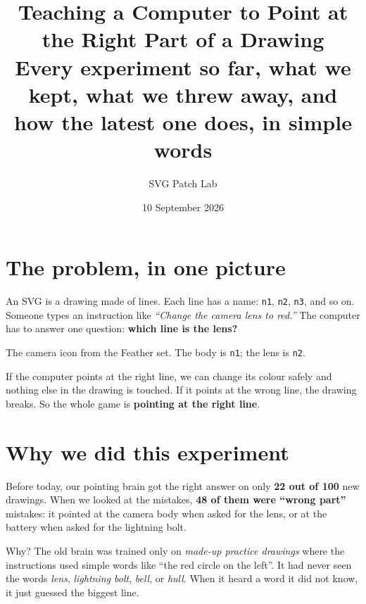 \documentclass[11pt,a4paper]{article}
\title{\Huge Teaching a Computer to Point at the Right Part of a Drawing\\[6pt]
\Large Every experiment so far, what we kept, what we threw away, and how the latest one does, in simple words}
\author{SVG Patch Lab}
\date{10 September 2026}
\begin{document}
\maketitle

\section*{The problem, in one picture}

An SVG is a drawing made of lines. Each line has a name: \texttt{n1}, \texttt{n2}, \texttt{n3}, and so on.
Someone types an instruction like \emph{``Change the camera lens to red.''}
The computer has to answer one question: \textbf{which line is the lens?}

\begin{center}

\small The camera icon from the Feather set. The body is \texttt{n1}; the lens is \texttt{n2}.
\end{center}

If the computer points at the right line, we can change its colour safely and nothing else in the drawing is touched.
If it points at the wrong line, the drawing breaks.
So the whole game is \textbf{pointing at the right line}.

\section*{Why we did this experiment}

Before today, our pointing brain got the right answer on only \textbf{22 out of 100} new drawings.
When we looked at the mistakes, \textbf{48 of them were ``wrong part''} mistakes: it pointed at the camera body when asked for the lens, or at the battery when asked for the lightning bolt.

Why? The old brain was trained only on \emph{made-up practice drawings} where the instructions used simple words like ``the red circle on the left''.
It had never seen the words \emph{lens}, \emph{lightning bolt}, \emph{bell}, or \emph{hull}.
When it heard a word it did not know, it just guessed the biggest line.
\end{document}
